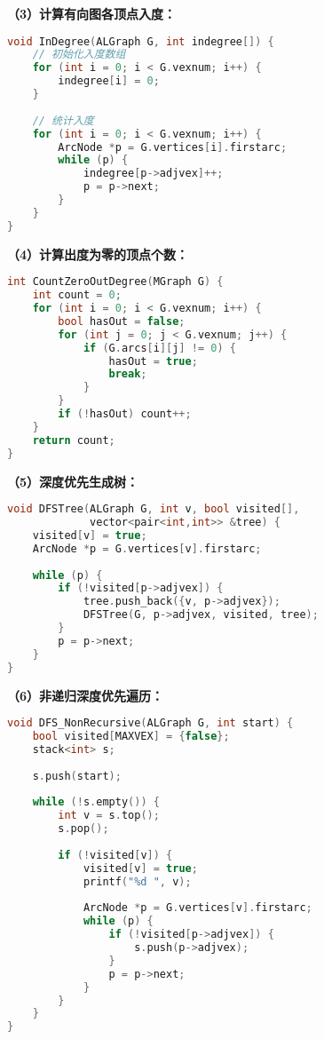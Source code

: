 \documentclass[12pt,a4paper]{amsart}
\begin{document}
\textbf{（3）计算有向图各顶点入度：}

\begin{lstlisting}[language=C++]
void InDegree(ALGraph G, int indegree[]) {
    // 初始化入度数组
    for (int i = 0; i < G.vexnum; i++) {
        indegree[i] = 0;
    }
    
    // 统计入度
    for (int i = 0; i < G.vexnum; i++) {
        ArcNode *p = G.vertices[i].firstarc;
        while (p) {
            indegree[p->adjvex]++;
            p = p->next;
        }
    }
}
\end{lstlisting}

\textbf{（4）计算出度为零的顶点个数：}

\begin{lstlisting}[language=C++]
int CountZeroOutDegree(MGraph G) {
    int count = 0;
    for (int i = 0; i < G.vexnum; i++) {
        bool hasOut = false;
        for (int j = 0; j < G.vexnum; j++) {
            if (G.arcs[i][j] != 0) {
                hasOut = true;
                break;
            }
        }
        if (!hasOut) count++;
    }
    return count;
}
\end{lstlisting}

\textbf{（5）深度优先生成树：}

\begin{lstlisting}[language=C++]
void DFSTree(ALGraph G, int v, bool visited[], 
             vector<pair<int,int>> &tree) {
    visited[v] = true;
    ArcNode *p = G.vertices[v].firstarc;
    
    while (p) {
        if (!visited[p->adjvex]) {
            tree.push_back({v, p->adjvex});
            DFSTree(G, p->adjvex, visited, tree);
        }
        p = p->next;
    }
}
\end{lstlisting}

\textbf{（6）非递归深度优先遍历：}

\begin{lstlisting}[language=C++]
void DFS_NonRecursive(ALGraph G, int start) {
    bool visited[MAXVEX] = {false};
    stack<int> s;
    
    s.push(start);
    
    while (!s.empty()) {
        int v = s.top();
        s.pop();
        
        if (!visited[v]) {
            visited[v] = true;
            printf("%d ", v);
            
            ArcNode *p = G.vertices[v].firstarc;
            while (p) {
                if (!visited[p->adjvex]) {
                    s.push(p->adjvex);
                }
                p = p->next;
            }
        }
    }
}
\end{lstlisting}
\end{document}
